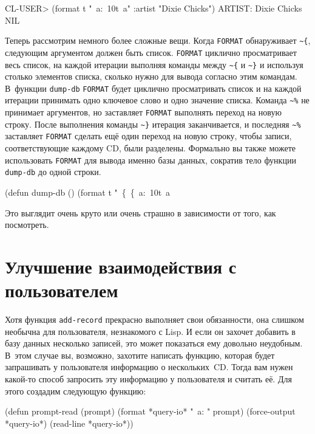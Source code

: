 \begin{myverb}
CL-USER> (format t "~a:~10t~a" :artist "Dixie Chicks")
ARTIST:   Dixie Chicks
NIL
\end{myverb}

Теперь рассмотрим немного более сложные вещи. Когда \lstinline{FORMAT} обнаруживает
\lstinline!~{!, следующим аргументом должен быть список. \lstinline{FORMAT} циклично
  просматривает весь список, на каждой итерации выполняя команды между \lstinline!~{! и
    \lstinline!~}! и используя столько элементов списка, сколько нужно для вывода согласно
  этим командам. В~функции \lstinline{dump-db} \lstinline{FORMAT} будет циклично просматривать
  список и на каждой итерации принимать одно ключевое слово и одно значение
  списка. Команда \lstinline!~%! не принимает аргументов, но заставляет \lstinline{FORMAT}
  выполнять переход на новую строку. После выполнения команды \lstinline!~}! итерация
заканчивается, и последняя \lstinline!~%! заставляет \lstinline{FORMAT} сделать ещё один
переход на новую строку, чтобы записи, соответствующие каждому CD, были разделены.
Формально вы также можете использовать \lstinline{FORMAT} для вывода именно базы данных,
сократив тело функции \lstinline{dump-db} до одной строки.

\begin{myverb}
(defun dump-db ()
  (format t "~\{~\{~a:~10t~a~%
\end{myverb}

Это выглядит очень круто или очень страшно в зависимости от того, как посмотреть.

\section{Улучшение взаимодействия с пользователем}

Хотя функция \lstinline{add-record} прекрасно выполняет свои обязанности, она слишком необычна
для пользователя, незнакомого с Lisp. И если он захочет добавить в базу данных несколько
записей, это может показаться ему довольно неудобным. В~этом случае вы, возможно, захотите
написать функцию, которая будет запрашивать у пользователя информацию о нескольких~CD.
Тогда вам нужен какой-то способ запросить эту информацию у пользователя и считать её. Для
этого создадим следующую функцию:

\begin{myverb}
(defun prompt-read (prompt)
 (format *query-io* "~a: " prompt)
 (force-output *query-io*)
 (read-line *query-io*))
\end{myverb}

